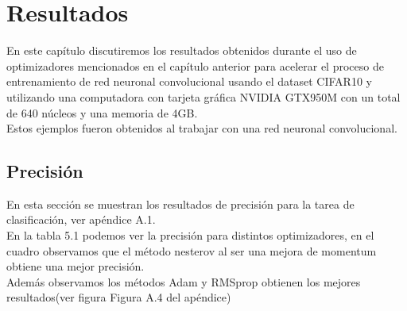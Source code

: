 \chapter{Resultados}
En este capítulo discutiremos los resultados obtenidos durante el uso de optimizadores mencionados en el capítulo anterior para acelerar el proceso de entrenamiento de red neuronal convolucional usando el dataset CIFAR10 y utilizando una computadora con tarjeta gráfica NVIDIA  GTX950M con un total de 640 núcleos y una memoria de 4GB.\\
Estos ejemplos fueron obtenidos al trabajar con una red neuronal convolucional.
\section{Precisión}
En esta sección se muestran los resultados de precisión para la tarea de clasificación, ver apéndice A.1.\\ En la tabla 5.1 podemos ver la precisión para distintos optimizadores, en el cuadro observamos que el método nesterov al ser una mejora de momentum obtiene una mejor precisión.\\Además observamos los métodos Adam y RMSprop obtienen los mejores resultados(ver figura Figura A.4 del apéndice)

